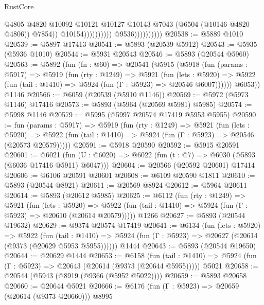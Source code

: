 \begin{lexlean}{RustCore}
\begin{coremodule}
                                                @4805
                                                @4820
                                                @10092
                                                @10121
                                                @10127
                                                @10143
                                                @7043
                                                (@6504 (@10146 @4820 @4806))
                                                @7854))
                                            @10154))))))))))
                        @9536))))))))))
@20538 := @5889 @1010
@20539 := @5897 @17413
@20541 := @5893 (@20539 @5912)
@20543 := @5935 (@5936 @1010)
@20544 := @5931 @20543
@20546 := @5893 (@20544 @5960)
@20563 := @5892
    (fun (fn : @60) =>
    @20541
      (@5915
        (@5918
          (fun (params : @5917) =>
          @5919
            (fun (rty : @1249) =>
            @5921
              (fun (lets : @5920) =>
              @5922 (fun (tail : @1410) => @5924 (fun (Γ : @5923) => @20546 @6007))))))
        @6053))
    @1146
@20566 := @6059 (@20539 (@5910 @1146))
@20569 := @5972 (@5973 @1146) @17416
@20573 := @5893 (@5964 (@20569 @5981) @5985)
@20574 := @5998 @1146
@20579 := @5995 (@5997 @20574 @17419 @5953 @5955)
@20590 := fun (params : @5917) =>
  @5919
    (fun (rty : @1249) =>
    @5921
      (fun (lets : @5920) =>
      @5922 (fun (tail : @1410) => @5924 (fun (Γ : @5923) => @20546 (@20573 @20579)))))
@20591 := @5918 @20590
@20592 := @5915 @20591
@20601 := @6021
    (fun (U : @6020) => @6022 (fun (t : @7) => @6030 (@5893 (@6036 @17416 @5911) @6047)))
@20604 := @20566 (@20592 @20601) @17414
@20606 := @6106 @20591 @20601
@20608 := @6109 @20590 @1811
@20610 := @5893 (@20544 @8921)
@20611 := @20569 @8924
@20612 := @5964 @20611
@20614 := @5893 (@20612 @5985)
@20625 := @6112
    (fun (rty : @1249) =>
    @5921
      (fun (lets : @5920) =>
      @5922 (fun (tail : @1410) => @5924 (fun (Γ : @5923) => @20610 (@20614 @20579)))))
    @1266
@20627 := @5893 (@20544 @19632)
@20629 := @9374 @20574 @17419
@20641 := @6134
    (fun (lets : @5920) =>
    @5922
      (fun (tail : @1410) =>
      @5924 (fun (Γ : @5923) => @20627 (@20614 (@9373 (@20629 @5953 @5955))))))
    @1444
@20643 := @5893 (@20544 @19650)
@20644 := @20629 @1444
@20653 := @6158
    (fun (tail : @1410) => @5924 (fun (Γ : @5923) => @20643 (@20614 (@9373 (@20644 @5955)))))
    @5021
@20658 := @20544 (@5943 (@8919 (@9366 (@5952 @5022))))
@20659 := @5893 @20658
@20660 := @20644 @5021
@20666 := @6176 (fun (Γ : @5923) => @20659 (@20614 (@9373 @20660))) @8995

\end{coremodule}
\end{lexlean}
